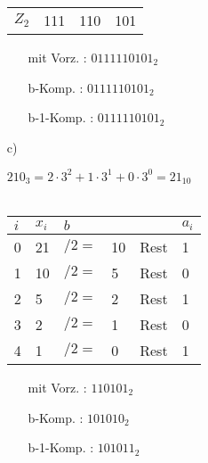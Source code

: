 \documentclass{article}
\begin{document}
\begin{enumerate}
\begin{minipage}[t]{0.5\textwidth}
\begin{tabular}[t]{l|ccc}
                \hline
                $Z_{2}$ & 111 & 110 & 101
            \end{tabular} 
        \end{minipage}
        \begin{minipage}[t]{0.4\textwidth}
            \begin{enumerate}
                \item[mit Vorz.]: $0111110101_2$
                \item[b-Komp.]: $0111110101_2$
                \item[b-1-Komp.]: $0111110101_2$
            \end{enumerate}
            \hfill
        \end{minipage}
        \item[c)]
        \begin{minipage}[t]{0.5\textwidth}
            $ 210_3 = 2\cdot 3^2 + 1\cdot 3^1 + 0\cdot 3^0 = 21_{10}$ \\\\
            \begin{tabular}{llllll}
                $i$ & $x_i$ & $b$       &       &       & $a_i$ \\
                \hline 
                0   & 21   & $/2 = $   & 10    & Rest  & 1 \\
                1   & 10   & $/2 = $   & 5     & Rest  & 0 \\
                2   & 5    & $/2 = $   & 2     & Rest  & 1 \\
                3   & 2    & $/2 = $   & 1     & Rest  & 0 \\
                4   & 1    & $/2 = $   & 0     & Rest  & 1
            \end{tabular}
        \end{minipage}
        \begin{minipage}[t]{0.4\textwidth}
            \begin{enumerate}
                \item[mit Vorz.]: $110101_2$
                \item[b-Komp.]: $101010_2$
                \item[b-1-Komp.]: $101011_2$
            \end{enumerate}
        \end{minipage}
    \end{enumerate}
\end{document}
